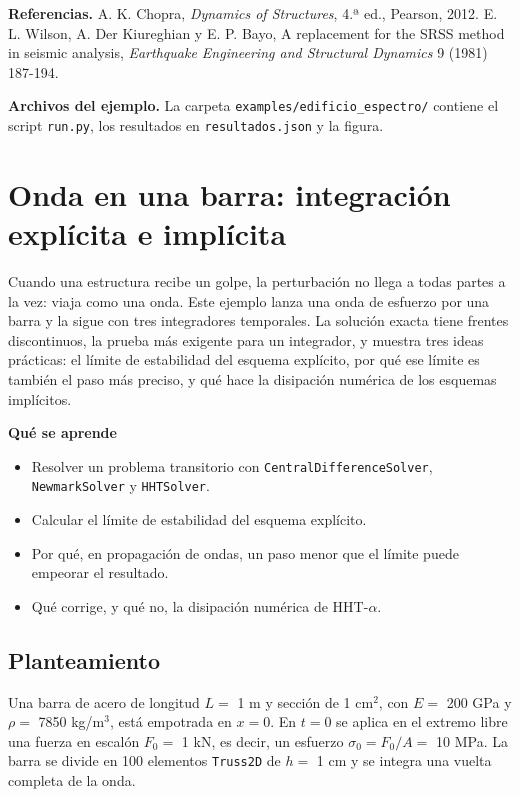 \documentclass[11pt,oneside]{report}
\renewcommand{\chaptermark}[1]{\markboth{Cap.\ \thechapter\ ---\ #1}{}}
\begin{document}
\textbf{Referencias.} A. K. Chopra, \textit{Dynamics of Structures}, 4.ª ed., Pearson, 2012. E. L. Wilson, A. Der Kiureghian y E. P. Bayo, \textquotedbl{}A replacement for the SRSS method in seismic analysis\textquotedbl{}, \textit{Earthquake Engineering and Structural Dynamics} 9 (1981) 187-194.

\textbf{Archivos del ejemplo.} La carpeta \texttt{examples/\allowbreak{}edificio\_\allowbreak{}espectro/\allowbreak{}} contiene el script \texttt{run.py}, los resultados en \texttt{resultados.json} y la figura.


\newpage

\chapter{Onda en una barra: integración explícita e implícita}
\chaptermark{Onda en una barra}
\label{cap:onda_barra}





Cuando una estructura recibe un golpe, la perturbación no llega a todas partes a la vez: viaja como una onda. Este ejemplo lanza una onda de esfuerzo por una barra y la sigue con tres integradores temporales. La solución exacta tiene frentes discontinuos, la prueba más exigente para un integrador, y muestra tres ideas prácticas: el límite de estabilidad del esquema explícito, por qué ese límite es también el paso más preciso, y qué hace la disipación numérica de los esquemas implícitos.

\textbf{Qué se aprende}

\begin{itemize}
  \item Resolver un problema transitorio con \texttt{CentralDifferenceSolver}, \texttt{NewmarkSolver} y \texttt{HHTSolver}.
  \item Calcular el límite de estabilidad del esquema explícito.
  \item Por qué, en propagación de ondas, un paso menor que el límite puede empeorar el resultado.
  \item Qué corrige, y qué no, la disipación numérica de HHT-\ensuremath{\alpha}.
\end{itemize}

\section{Planteamiento}

Una barra de acero de longitud $L =$ 1 m y sección de 1 cm\ensuremath{^{2}}, con $E =$ 200 GPa y $\rho =$ 7850 kg/m\ensuremath{^{3}}, está empotrada en $x = 0$. En $t = 0$ se aplica en el extremo libre una fuerza en escalón $F_0 =$ 1 kN, es decir, un esfuerzo $\sigma_0 = F_0/A =$ 10 MPa. La barra se divide en 100 elementos \texttt{Truss2D} de $h =$ 1 cm y se integra una vuelta completa de la onda.
\end{document}
